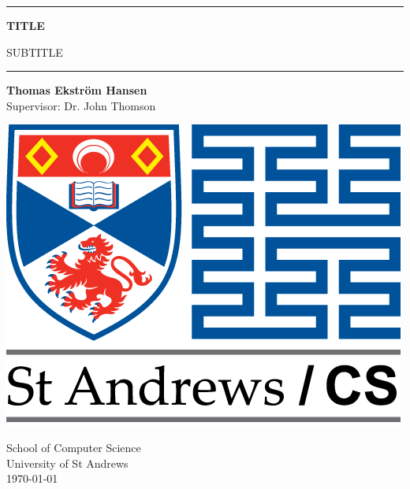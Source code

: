\begin{titlepage}
    \begin{center}
        \vspace*{1cm}
        
        {\rule{0.9\textwidth}{0.5mm}}
        
        \Huge
        \textbf{TITLE}
        
        \LARGE
        SUBTITLE
        
        {\noindent \hspace*{-0.65cm} \rule[0.3cm]{1.08\textwidth}{0.5mm}}
        
        \vspace{1.5cm}
        
        \Large
        \textbf{Thomas Ekstr{\" o}m Hansen}
        \\
        Supervisor: Dr. John Thomson
        
        \vfill
        
        \includegraphics[width=0.4\linewidth]{logo-uni-cs-mintext-long.png}
        
        \vspace{3cm}
        
        School of Computer Science
        \\
        University of St Andrews
        \\
        \today
    \end{center}
\end{titlepage}